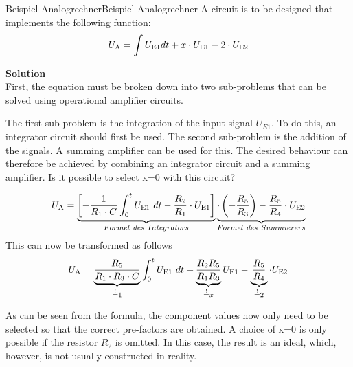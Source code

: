 \begin{frame}
{    \begin{expl}{Beispiel Analogrechner}{Beispiel Analogrechner}
        \renewcommand{\figurename}{Figure}
        A circuit is to be designed that implements the following function:
        \begin{equation}
            U_{\textnormal{A}} = \int U_{\textnormal{E1}} dt +x \cdot U_{\textnormal{E1}} - 2\cdot U_{\textnormal{E2}} 
        \end{equation}
        
        \textbf{Solution}\\
        First, the equation must be broken down into two sub-problems that can be solved using operational amplifier circuits.
        
        The first sub-problem is the integration of the input signal $U_{E1}$. To do this, an integrator circuit should first be used.
        The second sub-problem is the addition of the signals. A summing amplifier can be used for this.
        The desired behaviour can therefore be achieved by combining an integrator circuit and a summing amplifier. Is it possible to select x=0 with this circuit?        

        \begin{equation}
            U_{\textnormal{A}} = \underbrace{\left[ -\frac{1}{R_1 \cdot C} \int_{0}^{t} U_{\textnormal{E1}}~dt -\frac{R_2}{R_1} \cdot U_{\textnormal{E1}} \right]}_{Formel~des~Integrators} \underbrace{\cdot\left(-\frac{R_5}{R_3}\right)-\frac{R_5}{R_4}\cdot U_{\textnormal{E2}}}_{Formel~des~Summierers} 
        \end{equation}
        This can now be transformed as follows
        \begin{equation}
            U_{\textnormal{A}} = \underbrace{\frac{R_5}{R_1 \cdot R_3 \cdot C}}_{\stackrel{!}{=}1} \int_{0}^{t} U_{\textnormal{E1}}~dt + \underbrace{\frac{R_2 R_5}{R_1 R_3}}_{\stackrel{!}{=}x} U_{\textnormal{E1}} -\underbrace{\frac{R_5}{R_4}}_{\stackrel{!}{=}2} \cdot U_{\textnormal{E2}} 
        \end{equation}

        As can be seen from the formula, the component values now only need to be selected so that the correct pre-factors are obtained.
        A choice of x=0 is only possible if the resistor $R_2$ is omitted. In this case, the result is an \glqq ideal\grqq{}, which, however, is not usually constructed in reality.
 

\end{expl}}
\end{frame}

